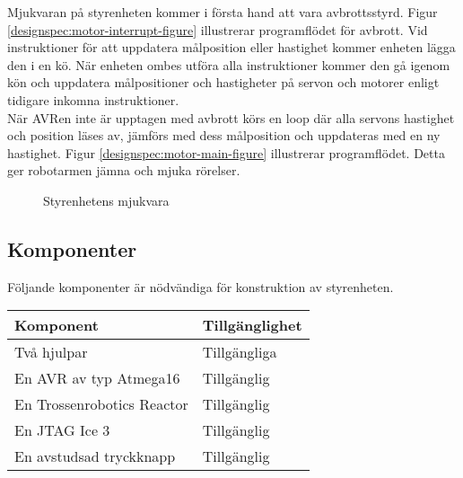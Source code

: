 Mjukvaran på styrenheten kommer i första hand att vara avbrottsstyrd. Figur \ref{designspec:motor-interrupt-figure} illustrerar programflödet för avbrott. Vid instruktioner för att uppdatera målposition eller hastighet kommer enheten lägga den i en kö. När enheten ombes utföra alla instruktioner kommer den gå igenom kön och uppdatera målpositioner och hastigheter på servon och motorer enligt tidigare inkomna instruktioner. \\
När AVRen inte är upptagen med avbrott körs en loop där alla servons hastighet och position läses av, jämförs med dess målposition och uppdateras med en ny hastighet. Figur \ref{designspec:motor-main-figure} illustrerar programflödet. Detta ger robotarmen jämna och mjuka rörelser. \\

\begin{figure}[H]
\centering
\begin{minipage}[b]{.5\linewidth}
\centering
\scalebox{0.7}{}
\label{designspec:motor-interrupt-figure}
\end{minipage}%
\begin{minipage}[b]{.5\linewidth}
\centering
\scalebox{0.6}{}
\label{designspec:motor-main-figure}
\end{minipage}
\caption{Styrenhetens mjukvara}\label{fig:1}
\end{figure}

\subsection{Komponenter}
Följande komponenter är nödvändiga för konstruktion av styrenheten. \\
\begin{tabularx}{\textwidth}{| l | X |}
	\hline
	{\textbf{Komponent}} & {\textbf{Tillgänglighet}} \\\hline
	{Två hjulpar} & {Tillgängliga} \\\hline
	{En AVR av typ Atmega16} & {Tillgänglig} \\\hline
	{En Trossenrobotics Reactor} & {Tillgänglig} \\\hline
	{En JTAG Ice 3} & {Tillgänglig} \\\hline
	{En avstudsad tryckknapp} & {Tillgänglig} \\\hline
\end{tabularx}
